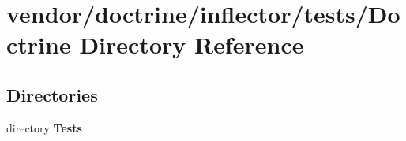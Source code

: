 \section{vendor/doctrine/inflector/tests/\+Doctrine Directory Reference}
\label{dir_00fa6d55b21976b40b74a4d51a1b7003}
\subsection*{Directories}
\begin{DoxyCompactItemize}
\item 
directory {\bf Tests}
\end{DoxyCompactItemize}
